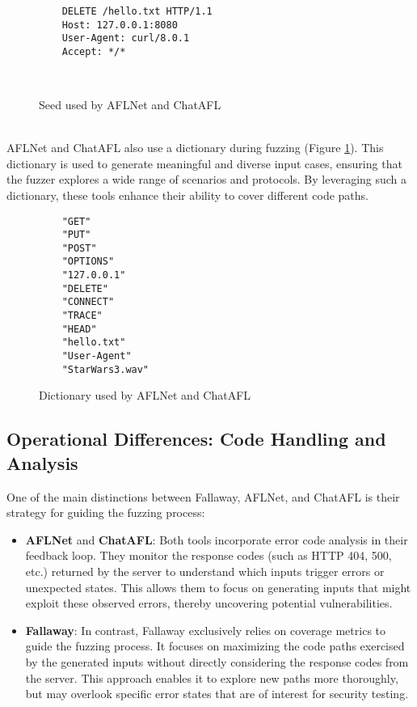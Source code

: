 \begin{figure}[H]
    \centering
    \begin{adjustbox}{valign=t}
    \begin{lstlisting}
    DELETE /hello.txt HTTP/1.1
    Host: 127.0.0.1:8080
    User-Agent: curl/8.0.1
    Accept: */*

    
    \end{lstlisting}
    \end{adjustbox}
    \caption{Seed used by AFLNet and ChatAFL}
\end{figure}
\phantom{}\\
AFLNet and ChatAFL also use a dictionary during fuzzing (Figure \ref{fig:dictionary}). This dictionary is used to generate meaningful and diverse input cases, ensuring that the fuzzer explores a wide range of scenarios and protocols. By leveraging such a dictionary, these tools enhance their ability to cover different code paths.
\begin{figure}[H]
    \centering
    \begin{adjustbox}{valign=t}
    \begin{lstlisting}
    "GET"
    "PUT"
    "POST"
    "OPTIONS"
    "127.0.0.1"
    "DELETE"
    "CONNECT"
    "TRACE"
    "HEAD"
    "hello.txt"
    "User-Agent"
    "StarWars3.wav"
    \end{lstlisting}
    \end{adjustbox}
    \caption{Dictionary used by AFLNet and ChatAFL}
    \label{fig:dictionary}
\end{figure}

\subsection{Operational Differences: Code Handling and Analysis}

One of the main distinctions between Fallaway, AFLNet, and ChatAFL is their strategy for guiding the fuzzing process:

\begin{itemize}
    \item \textbf{AFLNet} and \textbf{ChatAFL}: Both tools incorporate error code analysis in their feedback loop. They monitor the response codes (such as HTTP 404, 500, etc.) returned by the server to understand which inputs trigger errors or unexpected states. This allows them to focus on generating inputs that might exploit these observed errors, thereby uncovering potential vulnerabilities.
    \item \textbf{Fallaway}: In contrast, Fallaway exclusively relies on coverage metrics to guide the fuzzing process. It focuses on maximizing the code paths exercised by the generated inputs without directly considering the response codes from the server. This approach enables it to explore new paths more thoroughly, but may overlook specific error states that are of interest for security testing.
\end{itemize}

